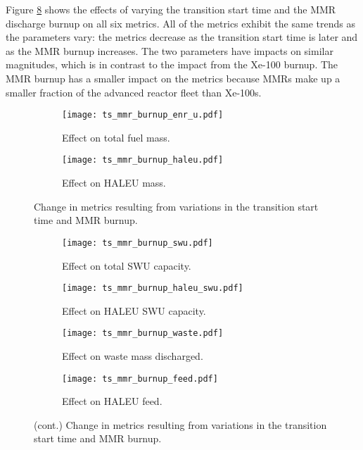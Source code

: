 Figure \ref{fig:ts_mmr_bu} shows the effects of varying the transition 
start time and the \gls{MMR} discharge burnup on all six metrics. All 
of the metrics exhibit the same trends as the parameters vary: the 
metrics decrease as the transition start time is later and as the 
\gls{MMR} burnup increases. The two parameters have impacts on similar 
magnitudes, which is in contrast to the impact from the Xe-100 burnup. The 
\gls{MMR} burnup has a smaller impact on the metrics because \glspl{MMR} 
make up a smaller fraction of the advanced reactor fleet than Xe-100s. 

\begin{figure}
    \begin{subfigure}[h!]{0.48\textwidth}
        \centering
        \texttt{[image: ts\_mmr\_burnup\_enr\_u.pdf]}
        \caption{Effect on total fuel mass.}
        \label{fig:ts_mmr_bu_enr_u}
    \end{subfigure}
    \hfill
    \begin{subfigure}[h!]{0.48\textwidth}
        \centering
        \texttt{[image: ts\_mmr\_burnup\_haleu.pdf]}
        \caption{Effect on HALEU mass.}
        \label{fig:ts_mmr_bu_haleu}
    \end{subfigure}
    \caption{Change in metrics resulting from variations in the 
    transition start time and MMR burnup.}
\end{figure}

\begin{figure}
    \ContinuedFloat    
    \begin{subfigure}[h!]{0.48\textwidth}
        \centering
        \texttt{[image: ts\_mmr\_burnup\_swu.pdf]}
        \caption{Effect on total SWU capacity.}
        \label{fig:ts_mmr_bu_swu}
    \end{subfigure}
    \hfill
    \begin{subfigure}[h!]{0.48\textwidth}
        \centering
        \texttt{[image: ts\_mmr\_burnup\_haleu\_swu.pdf]}
        \caption{Effect on HALEU SWU capacity.}
        \label{fig:ts_mmr_bu_haleu_swu}
    \end{subfigure}
    
    \begin{subfigure}[h!]{0.48\textwidth}
        \centering
        \texttt{[image: ts\_mmr\_burnup\_waste.pdf]}
        \caption{Effect on waste mass discharged.}
        \label{fig:ts_mmr_bu_waste}
    \end{subfigure}
    \hfill
    \begin{subfigure}[h!]{0.48\textwidth}
        \centering
        \texttt{[image: ts\_mmr\_burnup\_feed.pdf]}
        \caption{Effect on HALEU feed.}
        \label{fig:ts_mmr_bu_feed}
    \end{subfigure}
    \caption{(cont.) Change in metrics resulting from variations in the 
    transition start time and MMR burnup.}
    \label{fig:ts_mmr_bu}
\end{figure}

